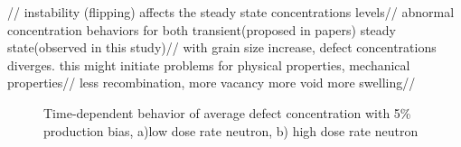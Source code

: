 \documentclass[a4paper]{article}
\begin{document}
//
instability (flipping) affects the steady state concentrations levels//
abnormal concentration behaviors for both transient(proposed in papers) steady state(observed in this study)//
with grain size increase, defect concentrations diverges. this might initiate problems for physical properties, mechanical properties//
less recombination, more vacancy more void more swelling//

    \begin{figure}[h!]  %
      \centering
      \qquad
      \caption{Time-dependent behavior of average defect concentration  with 5\% production bias, a)low dose rate neutron, b) high dose rate neutron}
      \label{figure:average_concentrations_neutron_5}
    \end{figure}
\end{document}
